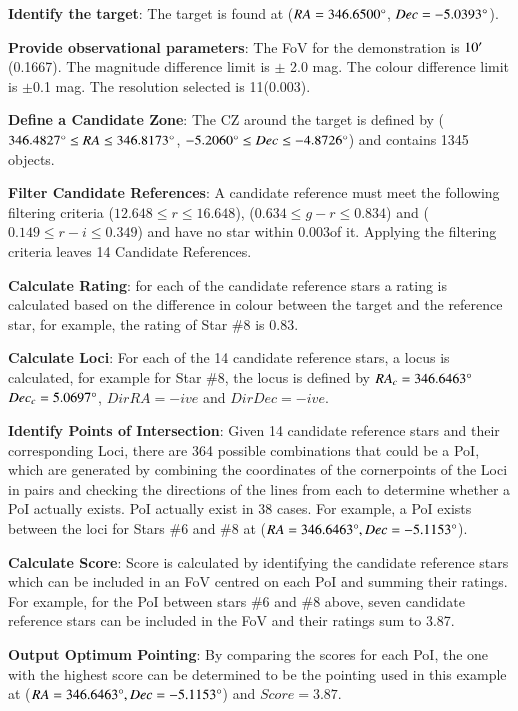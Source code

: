 \documentclass{aa}
\begin{document}
\textbf{Identify the target}: The target is found at (${RA = 346.6500\degree}$, ${Dec =-5.0393\degree}$).

\textbf{Provide observational parameters}: The FoV for the demonstration is $10^\prime$ (0.1667\textdegree). The magnitude difference limit is $\pm$ 2.0 mag. The colour difference limit is $\pm$0.1 mag. The resolution selected is 11\arcsec (0.003\textdegree).

\textbf{Define a Candidate Zone}: The CZ around the target is defined by (${346.4827\degree \leq RA \leq 346.8173\degree{}}$, ${-5.2060\degree \leq Dec \leq -4.8726\degree}$) and contains 1345 objects.

\textbf{Filter Candidate References}: A candidate reference must meet the following filtering criteria (${12.648 \leq r \leq 16.648}$), (${0.634 \leq g-r \leq 0.834}$) and (${0.149 \leq r-i \leq 0.349}$) and have no star within 0.003\textdegree of it. Applying the filtering criteria leaves 14 Candidate References.

\textbf{Calculate Rating}: for each of the candidate reference stars a rating is calculated based on the difference in colour between the target and the reference star, for example, the rating of Star \#{}8 is 0.83.

\textbf{Calculate Loci}: For each of the 14 candidate reference stars, a locus is calculated, for example for Star \#{}8, the locus is defined by ${RA_c=346.6463\degree{}}$ ${Dec_c=5.0697\degree{}}$, ${DirRA = -ive}$ and ${DirDec = -ive}$.

\textbf{Identify Points of Intersection}: Given 14 candidate reference stars and their corresponding Loci, there are 364 possible combinations that could be a PoI, which are generated by combining the coordinates of the cornerpoints of the Loci in pairs and checking the directions of the lines from each to determine whether a PoI actually exists.  PoI actually exist in 38 cases. For example, a PoI exists between the loci for Stars \#{}6 and \#{}8 at (${RA=346.6463\degree}, {Dec = -5.1153\degree}$).

\textbf{Calculate Score}: Score is calculated by identifying the candidate reference stars which can be included in an FoV centred on each PoI and summing their ratings. For example, for the PoI between stars \#{}6 and \#{}8 above, seven candidate reference stars can be included in the FoV and their ratings sum to 3.87.

\textbf{Output Optimum Pointing}: By comparing the scores for each PoI, the one with the highest score can be determined to be the pointing used in this example at (${RA=346.6463\degree}, {Dec = -5.1153\degree}$) and ${Score = 3.87}$.
\end{document}
